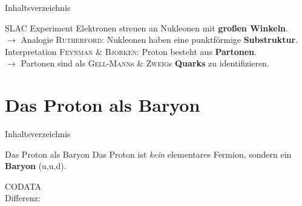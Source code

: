 \documentclass[t,9pt]{beamer}
\begin{document}
        \begin{frame}{Inhaltsverzeichnis}
                \tableofcontents[currentsection]
        \end{frame}

        \begin{frame}{SLAC Experiment}
                \pause
                Elektronen streuen an Nukleonen mit \textbf{großen Winkeln}. %
                \\\vspace{.1cm} $\rightarrow $ Analogie \textsc{Rutherford}: Nukleonen haben eine punktförmige \textbf{Substruktur}.
                \pause
                \\\vspace{.5cm} Interpretation \textsc{Feynman} \& \textsc{Bjorken}: Proton besteht aus \textbf{Partonen}.
                \\\vspace{.1cm} $\rightarrow $ Partonen sind als \textsc{Gell-Mann}s \& \textsc{Zweig}s \textbf{Quarks} zu identifizieren. %
        \end{frame} 

        \section{Das Proton als Baryon}

        \begin{frame}{Inhaltsverzeichnis}
                \tableofcontents[currentsection]
        \end{frame}

        \begin{frame}{Das Proton als Baryon}
                \pause
                Das Proton ist \textit{kein} elementares Fermion, sondern ein \textbf{Baryon} (u,u,d).
                \pause
                \begin{center}
                \end{center}
                \tiny\vspace{-.2cm}\hspace{8.8cm}CODATA\cite{CODATA_proton_magneton}\normalsize
                \pause
                \\ Differenz: 
                \begin{center}
                \end{center}
        \end{frame}
\end{document}
